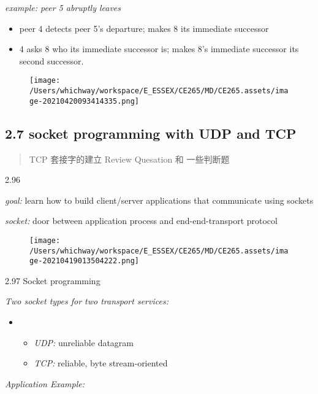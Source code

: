 \documentclass[
]{article}
\begin{document}
\emph{example: peer 5 abruptly leaves}

\begin{itemize}
\item
  peer 4 detects peer 5's departure; makes 8 its immediate successor
\item
  4 asks 8 who its immediate successor is; makes 8's immediate successor
  its second successor.
\end{itemize}

\begin{figure}
\centering
\texttt{[image: /Users/whichway/workspace/E\_ESSEX/CE265/MD/CE265.assets/image-20210420093414335.png]}
\caption{}
\end{figure}

\hypertarget{27-socket-programming-with-udp-and-tcp}{%
\subsection{2.7 socket programming with UDP and
TCP}\label{27-socket-programming-with-udp-and-tcp}}

\begin{quote}
TCP 套接字的建立 Review Quesation 和 一些判断题
\end{quote}

2.96

\emph{goal:} learn how to build client/server applications that
communicate using sockets

\emph{socket:} door between application process and end-end-transport
protocol

\begin{figure}
\centering
\texttt{[image: /Users/whichway/workspace/E\_ESSEX/CE265/MD/CE265.assets/image-20210419013504222.png]}
\caption{}
\end{figure}

2.97 Socket programming

\emph{Two socket types for two transport services:}

\begin{itemize}
\item
  \begin{itemize}
  \item
    \emph{UDP:} unreliable datagram
  \item
    \emph{TCP:} reliable, byte stream-oriented
  \end{itemize}
\end{itemize}

\emph{Application Example:}
\end{document}
